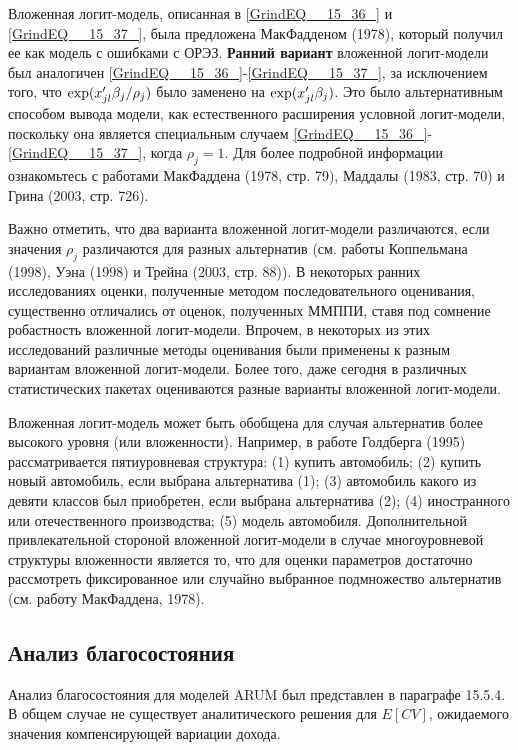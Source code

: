 Вложенная логит-модель, описанная в \eqref{GrindEQ__15_36_} и \eqref{GrindEQ__15_37_}, была предложена МакФадденом (1978), который получил ее как модель с ошибками с ОРЭЗ. \textbf{Ранний вариант } вложенной логит-модели был аналогичен \eqref{GrindEQ__15_36_}-\eqref{GrindEQ__15_37_}, за исключением того, что ${\rm exp}(x'_{jl}{\beta }_j/{\rho }_j)$ было заменено на ${\rm exp}(x'_{jl}{\beta }_j)$. Это было альтернативным способом вывода модели, как естественного расширения условной логит-модели, поскольку она является специальным случаем \eqref{GrindEQ__15_36_}-\eqref{GrindEQ__15_37_}, когда ${\rho }_j=1.$ Для более подробной информации ознакомьтесь с работами МакФаддена (1978, стр. 79), Маддалы (1983, стр. 70) и Грина (2003, стр. 726).

Важно отметить, что два варианта вложенной логит-модели различаются, если значения ${\rho }_j$ различаются для разных альтернатив (см. работы Коппельмана (1998), Уэна (1998) и Трейна (2003, стр. 88)). В некоторых ранних исследованиях оценки, полученные методом последовательного оценивания, существенно отличались от оценок, полученных ММППИ, ставя под сомнение робастность вложенной логит-модели. Впрочем, в некоторых из этих исследований различные методы оценивания были применены к разным вариантам вложенной логит-модели. Более того, даже сегодня в различных статистических пакетах оцениваются разные варианты вложенной логит-модели.

Вложенная логит-модель может быть обобщена для случая альтернатив более высокого уровня (или вложенности). Например, в работе Голдберга (1995) рассматривается пятиуровневая структура: (1) купить автомобиль; (2) купить новый автомобиль, если выбрана альтернатива (1); (3) автомобиль какого из девяти классов был приобретен, если выбрана альтернатива (2); (4) иностранного или отечественного производства; (5) модель автомобиля. Дополнительной привлекательной стороной вложенной логит-модели в случае многоуровневой структуры вложенности является то, что для оценки параметров достаточно рассмотреть фиксированное или случайно выбранное подмножество альтернатив (см. работу МакФаддена, 1978).

\subsection{Анализ благосостояния}

Анализ благосостояния для моделей ARUM был представлен в параграфе 15.5.4. В общем случае не существует аналитического решения для $E\left[CV\right]$, ожидаемого значения компенсирующей вариации дохода.

